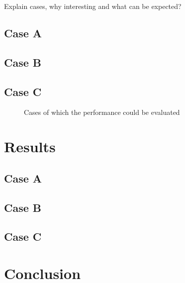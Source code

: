 Explain cases, why interesting and what can be expected?\\

\subsection{Case A}
\subsection{Case B}
\subsection{Case C}

\begin{figure}[h!]
	\centering
	\caption{Cases of which the performance could be evaluated \label{fig:routes}}
\end{figure}


\section{Results}
\subsection{Case A}
\subsection{Case B}
\subsection{Case C}


\section{Conclusion}


